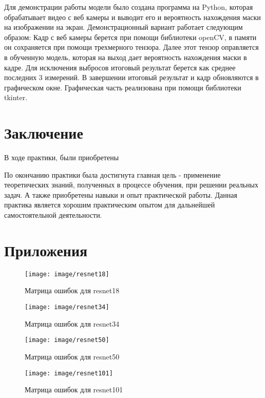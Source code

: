 \documentclass[a4paper,14pt]{article}
\begin{document}
Для демонстрации работы модели было создана программа на Python, которая обрабатывает видео с веб камеры и выводит его и вероятность нахождения маски на изображении на экран.
Демонстрационный вариант работает следующим образом:
Кадр с веб камеры берется при помощи библиотеки openCV, в памяти он сохраняется при помощи трехмерного тензора.
Далее этот тензор оправляется в обученную модель, которая на выход дает вероятность нахождения маски в кадре.
Для исключения выбросов итоговый результат берется как среднее последних 3 измерений.
В завершении итоговый результат и кадр обновляются в графическом окне.
Графическая часть реализована при помощи библиотеки tkinter.


\pagebreak
\section{Заключение}

В ходе практики, были приобретены

По окончанию практики была достигнута главная цель - применение теоретических знаний, полученных в процессе обучения, при решении реальных задач.
А также приобретены навыки и опыт практической работы.
Данная практика является хорошим практическим опытом для дальнейшей самостоятельной деятельности.

\pagebreak
\section{Приложения	}



\begin{figure}[H]
	\centering
	\texttt{[image: image/resnet18]}
	\caption{Матрица ошибок для resnet18}
	\label{fig:resnet18}
\end{figure}

\begin{figure}[H]
	\centering
	\texttt{[image: image/resnet34]}
	\caption{Матрица ошибок для resnet34}
	\label{fig:resnet34}
\end{figure}

\begin{figure}[H]
	\centering
	\texttt{[image: image/resnet50]}
	\caption{Матрица ошибок для resnet50}
	\label{fig:resnet50}
\end{figure}

\begin{figure}[H]
	\centering
	\texttt{[image: image/resnet101]}
	\caption{Матрица ошибок для resnet101}
	\label{fig:resnet101}
\end{figure}
\end{document}
